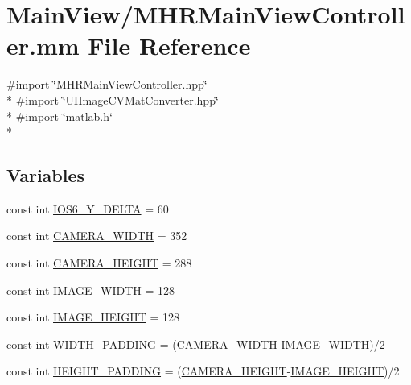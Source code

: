 \hypertarget{_m_h_r_main_view_controller_8mm}{\section{Main\+View/\+M\+H\+R\+Main\+View\+Controller.mm File Reference}
\label{_m_h_r_main_view_controller_8mm}
}
{\ttfamily \#import \char`\"{}M\+H\+R\+Main\+View\+Controller.\+hpp\char`\"{}}\\*
{\ttfamily \#import \char`\"{}U\+I\+Image\+C\+V\+Mat\+Converter.\+hpp\char`\"{}}\\*
{\ttfamily \#import \char`\"{}matlab.\+h\char`\"{}}\\*
\subsection*{Variables}
\begin{DoxyCompactItemize}
\item 
const int \hyperlink{_m_h_r_main_view_controller_8mm_a2cedb8dbc416f03a7e9d6e9533043773}{I\+O\+S6\+\_\+\+Y\+\_\+\+D\+E\+L\+T\+A} = 60
\item 
const int \hyperlink{_m_h_r_main_view_controller_8mm_a964d7f0fc9e80567acdcdff8d0b68b4a}{C\+A\+M\+E\+R\+A\+\_\+\+W\+I\+D\+T\+H} = 352
\item 
const int \hyperlink{_m_h_r_main_view_controller_8mm_abbbac9562c51eabfa14609a91464eb1c}{C\+A\+M\+E\+R\+A\+\_\+\+H\+E\+I\+G\+H\+T} = 288
\item 
const int \hyperlink{_m_h_r_main_view_controller_8mm_a86e681b82b6df52d2edfcd3361ef7ef2}{I\+M\+A\+G\+E\+\_\+\+W\+I\+D\+T\+H} = 128
\item 
const int \hyperlink{_m_h_r_main_view_controller_8mm_ac30c65321e99b04ebbdcdda7c2fac426}{I\+M\+A\+G\+E\+\_\+\+H\+E\+I\+G\+H\+T} = 128
\item 
const int \hyperlink{_m_h_r_main_view_controller_8mm_a3f33c36bfbff665a75263b4578776a71}{W\+I\+D\+T\+H\+\_\+\+P\+A\+D\+D\+I\+N\+G} = (\hyperlink{_m_h_r_main_view_controller_8mm_a964d7f0fc9e80567acdcdff8d0b68b4a}{C\+A\+M\+E\+R\+A\+\_\+\+W\+I\+D\+T\+H}-\/\hyperlink{_m_h_r_main_view_controller_8mm_a86e681b82b6df52d2edfcd3361ef7ef2}{I\+M\+A\+G\+E\+\_\+\+W\+I\+D\+T\+H})/2
\item 
const int \hyperlink{_m_h_r_main_view_controller_8mm_a024d8577f09294f908fb4431519650d8}{H\+E\+I\+G\+H\+T\+\_\+\+P\+A\+D\+D\+I\+N\+G} = (\hyperlink{_m_h_r_main_view_controller_8mm_abbbac9562c51eabfa14609a91464eb1c}{C\+A\+M\+E\+R\+A\+\_\+\+H\+E\+I\+G\+H\+T}-\/\hyperlink{_m_h_r_main_view_controller_8mm_ac30c65321e99b04ebbdcdda7c2fac426}{I\+M\+A\+G\+E\+\_\+\+H\+E\+I\+G\+H\+T})/2
\end{DoxyCompactItemize}


